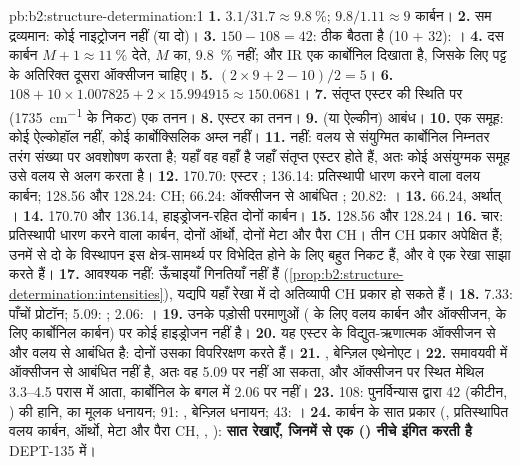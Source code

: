 \begin{solution}{pb:b2:structure-determination:1}
\textbf{1.} $3.1/31.7 \approx 9.8~\%$; $9.8/1.11 \approx 9$ कार्बन।
\textbf{2.} सम द्रव्यमान: कोई नाइट्रोजन नहीं (या दो)।
\textbf{3.} $150 - 108 = 42$:  ठीक बैठता है (10 + 32): ।
\textbf{4.} दस कार्बन $M+1 \approx 11~\%$ देते, $M$ का, 9.8~\% नहीं; और IR एक
कार्बोनिल दिखाता है, जिसके लिए  पट्ट के अतिरिक्त दूसरा ऑक्सीजन चाहिए।
\textbf{5.} $(2 \times 9 + 2 - 10)/2 = 5$।
\textbf{6.} $108 + 10 \times 1.007825 + 2 \times 15.994915 \approx 150.0681$।
\textbf{7.} संतृप्त एस्टर की स्थिति पर (\qty{1735}{cm^{-1}} के निकट) एक  तनन।
\textbf{8.} एस्टर का  तनन।
\textbf{9.}  (या ऐल्कीन)  आबंध।
\textbf{10.} एक  समूह: कोई ऐल्कोहॉल नहीं, कोई कार्बोक्सिलिक अम्ल नहीं।
\textbf{11.} नहीं: वलय से संयुग्मित कार्बोनिल निम्नतर तरंग संख्या पर अवशोषण करता है; यहाँ वह वहाँ है जहाँ
संतृप्त एस्टर होते हैं, अतः कोई असंयुग्मक समूह उसे वलय से अलग करता है।
\textbf{12.} 170.70: एस्टर ; 136.14: प्रतिस्थापी धारण करने वाला वलय कार्बन; 128.56 और 128.24:
 CH; 66.24: ऑक्सीजन से आबंधित ; 20.82: ।
\textbf{13.} 66.24, अर्थात् ।
\textbf{14.} 170.70 और 136.14, हाइड्रोजन-रहित दोनों कार्बन।
\textbf{15.} 128.56 और 128.24।
\textbf{16.} चार: प्रतिस्थापी धारण करने वाला कार्बन, दोनों ऑर्थो, दोनों मेटा और पैरा CH। तीन
CH प्रकार अपेक्षित हैं; उनमें से दो के विस्थापन इस क्षेत्र-सामर्थ्य पर विभेदित होने के लिए बहुत निकट हैं, और वे एक रेखा साझा करते हैं।
\textbf{17.} आवश्यक नहीं: ऊँचाइयाँ गिनतियाँ नहीं हैं (\cref{prop:b2:structure-determination:intensities}),
यद्यपि यहाँ रेखा में दो अतिव्यापी CH प्रकार हो सकते हैं।
\textbf{18.} 7.33: पाँचों  प्रोटॉन; 5.09: ; 2.06: ।
\textbf{19.} उनके पड़ोसी परमाणुओं ( के लिए वलय कार्बन और ऑक्सीजन,  के लिए कार्बोनिल
कार्बन) पर कोई हाइड्रोजन नहीं है।
\textbf{20.} यह एस्टर के विद्युत-ऋणात्मक ऑक्सीजन से और वलय से आबंधित है: दोनों उसका विपरिरक्षण करते हैं।
\textbf{21.} , बेन्ज़िल एथेनोएट।
\textbf{22.} समावयवी में  ऑक्सीजन से आबंधित नहीं है, अतः वह 5.09 पर नहीं आ सकता, और
ऑक्सीजन पर स्थित मेथिल 3.3--4.5 परास में आता, कार्बोनिल के बगल में 2.06 पर नहीं।
\textbf{23.} 108: पुनर्विन्यास द्वारा 42 (कीटीन, ) की हानि,  का
मूलक धनायन; 91: , बेन्ज़िल धनायन; 43: ।
\textbf{24.} कार्बन के सात प्रकार (, प्रतिस्थापित वलय कार्बन, ऑर्थो, मेटा और पैरा CH,
, ): \textbf{सात रेखाएँ, जिनमें से एक () नीचे इंगित करती है} DEPT-135 में।
\end{solution}
